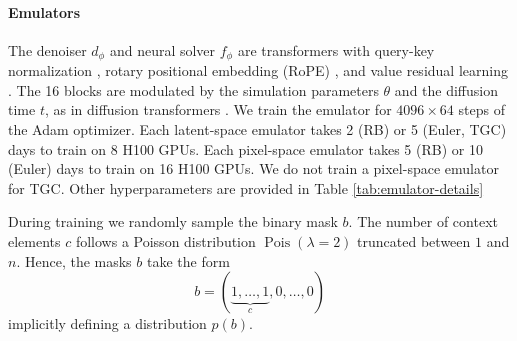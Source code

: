 \begin{subappendices}
\clearpage
\paragraph{Emulators} The denoiser $d_\phi$ and neural solver $f_\phi$ are transformers with query-key normalization \cite{henry2020querykey}, rotary positional embedding (RoPE) \cite{su2024roformer, heo2025rotary}, and value residual learning \cite{zhou2024value}. The 16 blocks are modulated by the simulation parameters $\theta$ and the diffusion time $t$, as in diffusion transformers \cite{peebles2023scalable}. We train the emulator for $4096 \times 64$ steps of the Adam \cite{kingma2015adam} optimizer. Each latent-space emulator takes 2 (RB) or 5 (Euler, TGC) days to train on 8 H100 GPUs. Each pixel-space emulator takes 5 (RB) or 10 (Euler) days to train on 16 H100 GPUs. We do not train a pixel-space emulator for TGC. Other hyperparameters are provided in Table \ref{tab:emulator-details}

During training we randomly sample the binary mask $b$. The number of context elements $c$ follows a Poisson distribution $\operatorname{Pois}(\lambda = 2)$ truncated between $1$ and $n$. Hence, the masks $b$ take the form
\begin{equation}
    b = (\underbrace{1, \dots, 1}_{c}, 0, \dots, 0)
\end{equation}
implicitly defining a distribution $p(b)$.


\end{subappendices}
